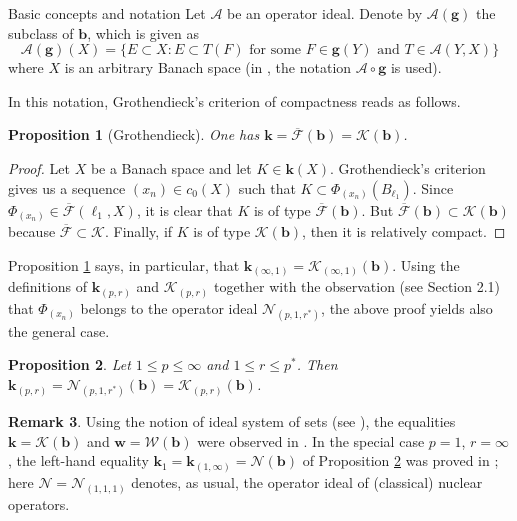 \documentclass[a4paper,11pt]{amsart}
\newtheorem{prop}{Proposition}[section]
\theoremstyle{definition}
\newtheorem{rem}[prop]{Remark}
\theoremstyle{definition}
\theoremstyle{definition}
\begin{document}
\begin{section}{Basic concepts and notation}
Let ${{\mathcal A}}$ be an operator ideal. Denote by ${{\mathcal A}}({\boldsymbol{{g}}})$ the subclass of ${\boldsymbol{{b}}}$, which is given as
\[
{{\mathcal A}} ({\boldsymbol{{g}}})(X)= \{ E \subset X : E\subset T(F) \textrm{ for some } F\in {\boldsymbol{{g}}}(Y) \textrm{ and } T\in {{\mathcal A}}(Y, X) \}
\]
where $X$ is an arbitrary Banach space (in \cite{S3}, the notation ${{\mathcal A}} \circ {\boldsymbol{{g}}}$ is used).

In this notation, Grothendieck's criterion of compactness reads as follows.
\begin{prop}[Grothendieck]\label{G}
One has ${\boldsymbol{k}} = \overline {{\mathcal F}} ({\boldsymbol{b}} ) = {{\mathcal K}} ({\boldsymbol{b}})$.
\end{prop} 

\begin{proof}
Let $X$ be a Banach space and let $K \in {\boldsymbol{k}} (X)$. Grothendieck's criterion gives us a sequence $(x_n)\in c_0(X)$ such that $K\subset \Phi _{(x_n)}(B_{\ell_1})$. Since $\Phi _{(x_n)}\in \overline {{\mathcal F}}(\ell_1 , X)$, it is clear that $K$ is of type $\overline {{\mathcal F}} ({\boldsymbol{b}})$. But $\overline {{\mathcal F}} ({\boldsymbol{b}}) \subset {{\mathcal K}} ({\boldsymbol{b}})$ because $\overline {{\mathcal F}} \subset {{\mathcal K}}$. Finally, if $K$ is of type ${{\mathcal K}} ({\boldsymbol{b}})$, then it is relatively compact. 
\end{proof}

Proposition \ref{G} says, in particular, that ${\boldsymbol{k}} _{(\infty, 1)}= {{\mathcal K}}_{(\infty, 1)}( {\boldsymbol{b}})$. Using the definitions of ${\boldsymbol{k}} _{{(p,r)}}$ and ${{\mathcal K}}_{{(p,r)}}$ together with the observation (see Section 2.1) that $\Phi_{(x_n)}$ belongs to the operator ideal ${{\mathcal N}}_{(p,1,{r^{\ast}})}$, the above proof yields also the general case.

\begin{prop}\label{G-gen}
Let $1\leq p \leq \infty$ and $1\leq r \leq {p^{\ast}}$. Then ${\boldsymbol{k}} _{{(p,r)}} = {{\mathcal N}}_{(p,1,{r^{\ast}})}({\boldsymbol{b}})= {{\mathcal K}}_{{(p,r)}} ({\boldsymbol{b}})$.
\end{prop}

\begin{rem}\label{rem2.3}
Using the notion of ideal system of sets (see \cite{S73}), the equalities ${\boldsymbol{k}} = {{\mathcal K}}({\boldsymbol{b}})$ and ${\boldsymbol{w}} = {{\mathcal W}} ({\boldsymbol{b}})$ were observed in \cite{S3}. In the special case $p=1$, $r=\infty$, the left-hand equality ${\boldsymbol{k}}_1= {\boldsymbol{k}}_{(1, \infty)}= {{\mathcal N}} ({\boldsymbol{b}})$ of Proposition \ref{G-gen} was proved in \cite{S73}; here ${{\mathcal N}}= {{\mathcal N}}_{(1,1,1)}$ denotes, as usual, the operator ideal of (classical) nuclear operators. 
\end{rem}


\end{section}
\end{document}
